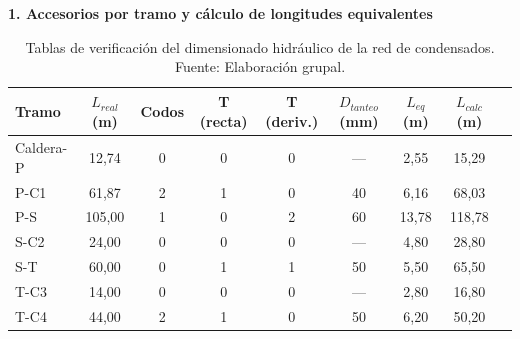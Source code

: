 \documentclass[12pt]{article}
\begin{document}
\begin{landscape}
	\begin{table}[H]
		\centering
		\normalsize
		\caption{Tablas de verificación del dimensionado hidráulico de la red de condensados. Fuente: Elaboración grupal.}
		\label{tab:verificacion-red-condensados-completa}

		\begin{minipage}{\linewidth}
			\centering
			\textbf{1. Accesorios por tramo y cálculo de longitudes equivalentes}
			\vspace{0.2cm}
			\begin{tabular}{lcccccccc}
				\toprule
				\textbf{Tramo} & \textbf{$L_{real}$ (m)} & \textbf{Codos} & \textbf{T (recta)} & \textbf{T (deriv.)} & \textbf{$D_{tanteo}$ (mm)} & \textbf{$L_{eq}$ (m)} & \textbf{$L_{calc}$ (m)} \\
				\midrule
				Caldera-P      & 12,74                   & 0              & 0                  & 0                   & ---                        & 2,55                  & 15,29                   \\
				P-C1           & 61,87                   & 2              & 1                  & 0                   & 40                         & 6,16                  & 68,03                   \\
				P-S            & 105,00                  & 1              & 0                  & 2                   & 60                        & 13,78                 & 118,78                  \\
				S-C2        & 24,00                   & 0              & 0                  & 0                   & ---                        & 4,80                  & 28,80                   \\
				S-T            & 60,00                   & 0              & 1                  & 1                   & 50                         & 5,50                  & 65,50                   \\
				T-C3        & 14,00                   & 0              & 0                  & 0                   & ---                        & 2,80                  & 16,80                   \\
				T-C4        & 44,00                   & 2              & 1                  & 0                   & 50                         & 6,20                  & 50,20                   \\
				\bottomrule
			\end{tabular}
		\end{minipage}


\end{table}
\end{landscape}
\end{document}
